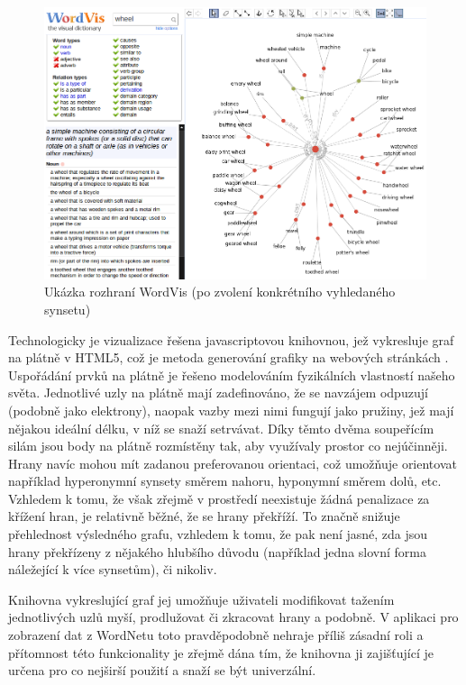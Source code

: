 \documentclass[a4paper, 11pt, oneside]{book}
\begin{document}
				\begin{figure}[h]
					\centering
					\includegraphics[width=1.0\textwidth]{wordvis.png}
					\caption{Ukázka rozhraní WordVis (po zvolení konkrétního vyhledaného synsetu)}
					\label{fig:wordvis}
				\end{figure}

				Technologicky je vizualizace řešena javascriptovou knihovnou, jež vykresluje graf na plátně v HTML5, což je metoda generování grafiky na webových stránkách \parencite{w3schools2017htmlcanvas}. Uspořádání prvků na plátně je řešeno modelováním fyzikálních vlastností našeho světa. Jednotlivé uzly na plátně mají zadefinováno, že se navzájem odpuzují (podobně jako elektrony), naopak vazby mezi nimi fungují jako pružiny, jež mají nějakou ideální délku, v níž se snaží setrvávat. Díky těmto dvěma soupeřícím silám jsou body na plátně rozmístěny tak, aby využívaly prostor co nejúčinněji. Hrany navíc mohou mít zadanou preferovanou orientaci, což umožňuje orientovat například hyperonymní synsety směrem nahoru, hyponymní směrem dolů, etc. \parencite{wordvis2010vercruysse} Vzhledem k tomu, že však zřejmě v prostředí neexistuje žádná penalizace za křížení hran, je relativně běžné, že se hrany překříží. To značně snižuje přehlednost výsledného grafu, vzhledem k tomu, že pak není jasné, zda jsou hrany překřízeny z nějakého hlubšího důvodu (například jedna slovní forma náležející k více synsetům), či nikoliv. 

				Knihovna vykreslující graf jej umožňuje uživateli modifikovat tažením jednotlivých uzlů myší, prodlužovat či zkracovat hrany a podobně. V aplikaci pro zobrazení dat z WordNetu toto pravděpodobně nehraje příliš zásadní roli a přítomnost této funkcionality je zřejmě dána tím, že knihovna ji zajišťující je určena pro co nejširší použití a snaží se být univerzální. \parencite{wordvis2010vercruysse}
\end{document}
